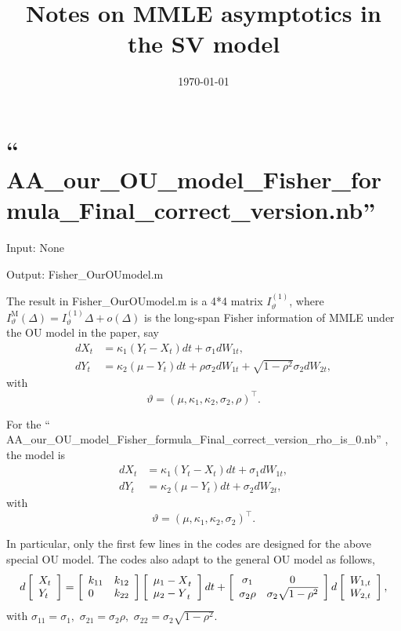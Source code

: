 \documentclass[11pt]{article}%
\theoremstyle{definition}
\begin{document}
\title{Notes on MMLE asymptotics in the SV model}
\date{\today }
\maketitle
\tableofcontents

\section{\textquotedblleft
AA\_our\_OU\_model\_Fisher\_formula\_Final\_correct\_version.nb\textquotedblright%
}

Input: None

Output: Fisher\_OurOUmodel.m

The result in Fisher\_OurOUmodel.m is a 4*4 matrix $I_{\vartheta}^{(1)}$,
where $I_{\vartheta}^{\text{M}}(\Delta)=I_{\vartheta}^{(1)}\Delta+o(\Delta)$
is the long-span Fisher information of MMLE under the OU model in the paper,
say%
\begin{align*}
dX_{t}  &  =\kappa{_{1}({Y}_{t}-X_{t})}dt+\sigma_{1}dW_{1t},\\
dY_{t}  &  =\kappa{_{2}(\mu-{Y}_{t})}dt+\rho\sigma_{2}dW_{1t}+\sqrt{1-\rho
^{2}}\sigma_{2}dW_{2t},
\end{align*}
with%
\[
\vartheta=(\mu,\kappa{_{1},}\kappa_{2},\sigma_{2},\rho)^{\intercal}.
\]


For the \textquotedblleft
AA\_our\_OU\_model\_Fisher\_formula\_Final\_correct\_version\_rho\_is\_0.nb\textquotedblright%
, the model is
\begin{align*}
dX_{t}  &  =\kappa{_{1}({Y}_{t}-X_{t})}dt+\sigma_{1}dW_{1t},\\
dY_{t}  &  =\kappa{_{2}(\mu-{Y}_{t})}dt+\sigma_{2}dW_{2t},
\end{align*}
with%
\[
\vartheta=(\mu,\kappa{_{1},}\kappa_{2},\sigma_{2})^{\intercal}.
\]


In particular, only the first few lines in the codes are designed for the
above special OU model. The codes also adapt to the general OU model as
follows,%
\[
d\left[
\begin{array}
[c]{l}%
{X}_{t}\\
{Y}_{t}%
\end{array}
\right]  =\left[
\begin{array}
[c]{ll}%
{k_{11}} & {k_{12}}\\
{0} & {k_{22}}%
\end{array}
\right]  \left[
\begin{array}
[c]{l}%
{\mu_{1}-X}_{t}\\
{\mu_{2}-Y}_{t}%
\end{array}
\right]  dt+\left[
\begin{array}
[c]{cc}%
{\sigma_{1}} & {0}\\
{\sigma_{2}}\rho & {\sigma_{2}\sqrt{1-\rho^{2}}}%
\end{array}
\right]  d\left[
\begin{array}
[c]{l}%
{W_{1,t}}\\
{W_{2,t}}%
\end{array}
\right]  ,
\]
with ${\sigma_{11}=\sigma_{1},}$ ${\sigma_{21}=\sigma_{2}}\rho,$ ${\sigma
_{22}=\sigma_{2}\sqrt{1-\rho^{2}}}$.
\end{document}
